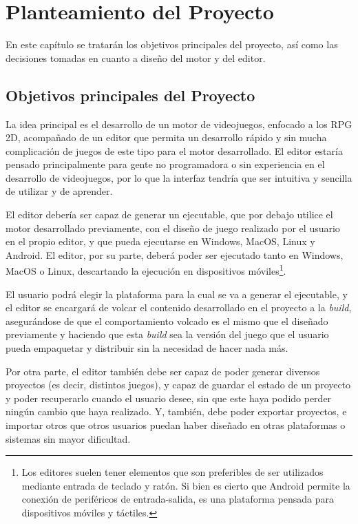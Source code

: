 \chapter{Planteamiento del Proyecto}
\label{cap:planteamiento}

\begin{resumen}
En este capítulo se tratarán los objetivos principales del proyecto, así como las decisiones tomadas en cuanto a diseño del motor y del editor.
\end{resumen}

\section{Objetivos principales del Proyecto}
La idea principal es el desarrollo de un motor de videojuegos, enfocado a los RPG 2D, acompañado de un editor que permita un desarrollo rápido y sin mucha complicación de juegos de este tipo para el motor desarrollado. El editor estaría pensado principalmente para gente no programadora o sin experiencia en el desarrollo de videojuegos, por lo que la interfaz tendría que ser intuitiva y sencilla de utilizar y de aprender.

\smallskip

El editor debería ser capaz de generar un ejecutable, que por debajo utilice el motor desarrollado previamente, con el diseño de juego realizado por el usuario en el propio editor, y que pueda ejecutarse en Windows, MacOS, Linux y Android. El editor, por su parte, deberá poder ser ejecutado tanto en Windows, MacOS o Linux, descartando la ejecución en dispositivos móviles\footnote{Los editores suelen tener elementos que son preferibles de ser utilizados mediante entrada de teclado y ratón. Si bien es cierto que Android permite la conexión de periféricos de entrada-salida, es una plataforma pensada para dispositivos móviles y táctiles.}.

\smallskip

El usuario podrá elegir la plataforma para la cual se va a generar el ejecutable, y el editor se encargará de volcar el contenido desarrollado en el proyecto a la \textit{build}, asegurándose de que el comportamiento volcado es el mismo que el diseñado previamente y haciendo que esta \textit{build} sea la versión del juego que el usuario pueda empaquetar y distribuir sin la necesidad de hacer nada más.

\medskip

Por otra parte, el editor también debe ser capaz de poder generar diversos proyectos (es decir, distintos juegos), y capaz de guardar el estado de un proyecto y poder recuperarlo cuando el usuario desee, sin que este haya podido perder ningún cambio que haya realizado. Y, también, debe poder exportar proyectos, e importar otros que otros usuarios puedan haber diseñado en otras plataformas o sistemas sin mayor dificultad.

